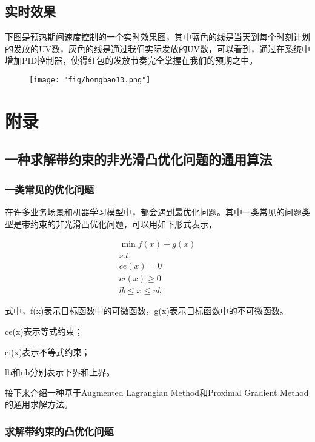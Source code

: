 \subsection{实时效果}
下图是预热期间速度控制的一个实时效果图，其中蓝色的线是当天到每个时刻计划的发放的UV数，灰色的线是通过我们实际发放的UV数，可以看到，通过在系统中增加PID控制器，使得红包的发放节奏完全掌握在我们的预期之中。

\begin{figure}[!h]
	\centering
	\texttt{[image: "fig/hongbao13.png"]}
	\caption{}
	\label{fig:hongbao13}
\end{figure}




\section{附录} 

\subsection{一种求解带约束的非光滑凸优化问题的通用算法}


\subsubsection{一类常见的优化问题}

在许多业务场景和机器学习模型中，都会遇到最优化问题。其中一类常见的问题类型是带约束的非光滑凸优化问题，可以用如下形式表示，

\begin{align}
\min f(x) + g(x) \\
s.t.\\
ce(x) = 0\\
ci(x) \ge 0 \\
lb \le x \le ub
\end{align}

式中，f(x)表示目标函数中的可微函数，g(x)表示目标函数中的不可微函数。

ce(x)表示等式约束；

ci(x)表示不等式约束；

lb和ub分别表示下界和上界。

接下来介绍一种基于Augmented Lagrangian Method和Proximal Gradient Method的通用求解方法。

\subsubsection{求解带约束的凸优化问题}

